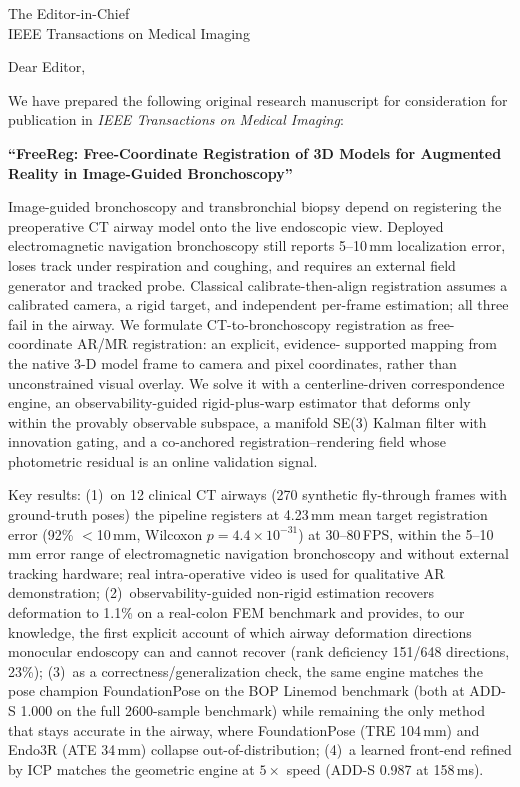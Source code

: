 \documentclass[10pt]{letter}
\begin{document}
\begin{letter}{The Editor-in-Chief\\IEEE Transactions on Medical Imaging}
\opening{Dear Editor,}

We have prepared the following original research manuscript for consideration
for publication in \emph{IEEE Transactions on Medical Imaging}:

\textbf{``FreeReg: Free-Coordinate Registration of 3D Models for Augmented Reality in Image-Guided Bronchoscopy''}

Image-guided bronchoscopy and transbronchial biopsy depend on registering the
preoperative CT airway model onto the live endoscopic view. Deployed
electromagnetic navigation bronchoscopy still reports 5--10\,mm localization
error, loses track under respiration and coughing, and requires an external
field generator and tracked probe. Classical calibrate-then-align registration
assumes a calibrated camera, a rigid target, and independent per-frame
estimation; all three fail in the airway. We formulate CT-to-bronchoscopy
registration as free-coordinate AR/MR registration: an explicit, evidence-
supported mapping from the native 3-D model frame to camera and pixel
coordinates, rather than unconstrained visual overlay. We solve it with a
centerline-driven correspondence engine, an observability-guided
rigid-plus-warp estimator that deforms only within the provably observable
subspace, a manifold SE(3) Kalman filter with innovation gating, and a
co-anchored registration--rendering field whose photometric residual is an
online validation signal.

Key results: (1)~on 12 clinical CT airways (270 synthetic fly-through
frames with ground-truth poses) the pipeline registers at 4.23\,mm mean
target registration error (92\% $<$10\,mm, Wilcoxon $p=4.4\times10^{-31}$)
at 30--80\,FPS, within the 5--10\,mm error range of electromagnetic
navigation bronchoscopy and without external tracking hardware; real
intra-operative video is used for qualitative AR demonstration;
(2)~observability-guided non-rigid estimation recovers deformation to 1.1\% on
a real-colon FEM benchmark and provides, to our knowledge, the first explicit
account of which airway deformation directions monocular endoscopy can and
cannot recover (rank deficiency 151/648 directions, 23\%); (3)~as a
correctness/generalization check, the same engine matches the pose champion
FoundationPose on the BOP Linemod benchmark (both at ADD-S 1.000 on the full
2600-sample benchmark) while remaining the only method that stays accurate in
the airway, where FoundationPose (TRE 104\,mm) and Endo3R (ATE 34\,mm) collapse
out-of-distribution; (4)~a learned front-end refined by ICP matches the
geometric engine at $5\times$ speed (ADD-S 0.987 at 158\,ms).


\end{letter}
\end{document}
